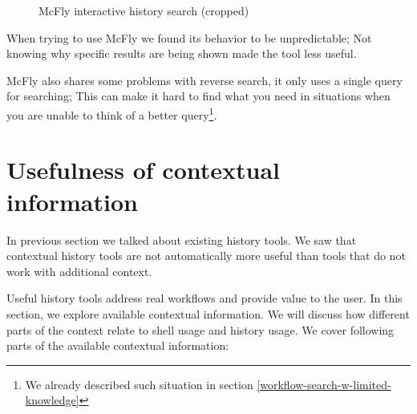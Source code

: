 \begin{figure}[h]
  \caption{McFly interactive history search (cropped)}
  \label{tools-mcfly}
\end{figure}


When trying to use McFly we found its behavior to be unpredictable; Not knowing why specific results are being shown made the tool less useful. 

McFly also shares some problems with reverse search, it only uses a single query for searching; This can make it hard to find what you need in situations when you are unable to think of a better query\footnote{We already described such situation in section \ref{workflow-search-w-limited-knowledge}}. 




\section{Usefulness of contextual information}


In previous section we talked about existing history tools. We saw that contextual history tools are not automatically more useful than tools that do not work with additional context. 

Useful history tools address real workflows and provide value to the user.
In this section, we explore available contextual information. We will discuss how different parts of the context relate to shell usage and history usage. %
We cover following parts of the available contextual information:

